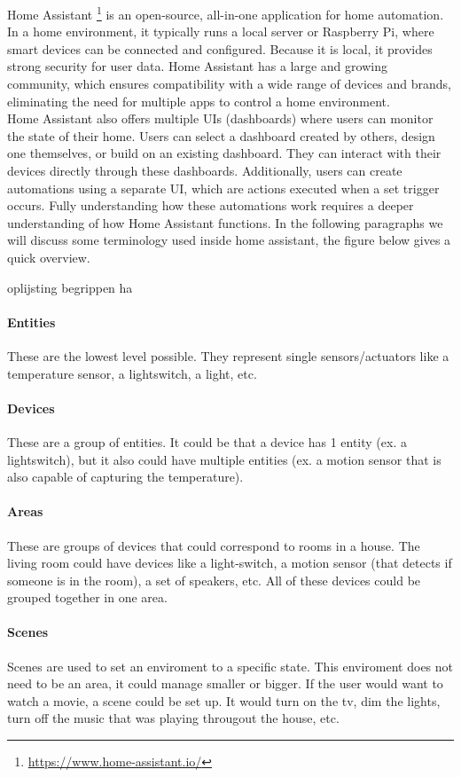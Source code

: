 \documentclass[11pt,a4paper]{report}
\begin{document}
Home Assistant \footnote{\url{https://www.home-assistant.io/}} is an open-source, all-in-one application for home automation. In a home environment, it typically  runs a local server or Raspberry Pi, where smart devices can be connected and configured. Because it is local, it provides strong security for user data. Home Assistant has a large and growing community, which ensures compatibility with a wide range of devices and brands, eliminating the need for multiple apps to control a home environment.\\
Home Assistant also offers multiple UIs (dashboards) where users can monitor the state of their home. Users can select a dashboard created by others, design one themselves, or build on an existing dashboard. They can interact with their devices directly through these dashboards. Additionally, users can create automations using a separate UI, which are actions executed when a set trigger occurs. Fully understanding how these automations work requires a deeper understanding of how Home Assistant functions.
In the following paragraphs we will discuss some terminology used inside home assistant, the figure below gives a quick overview.



oplijsting begrippen ha


\paragraph{Entities}
These are the lowest level possible. They represent single sensors/actuators like a temperature sensor, a lightswitch, a light, etc.
\paragraph{Devices}
These are a group of entities. It could be that a device has 1 entity (ex. a lightswitch), but it also could have multiple entities (ex. a motion sensor that is also capable of capturing the temperature).
\paragraph{Areas}
These are groups of devices that could correspond to rooms in a house. The living room could have devices like a light-switch, a motion sensor (that detects if someone is in the room), a set of speakers, etc. All of these devices could be grouped together in one area.
\paragraph{Scenes}
Scenes are used to set an enviroment to a specific state. This enviroment does not need to be an area, it could manage smaller or bigger. If the user would want to watch a movie, a scene could be set up. It would turn on the tv, dim the lights, turn off the music that was playing througout the house, etc.
\end{document}
